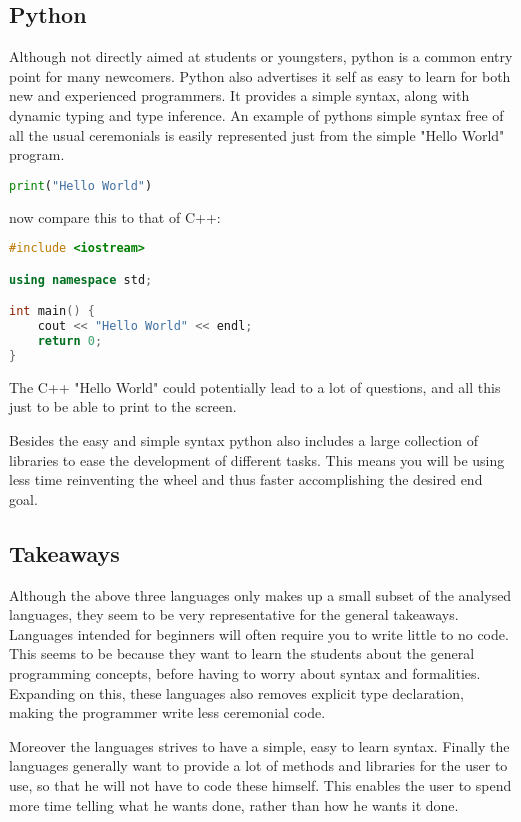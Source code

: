 \subsection{Python}
Although not directly aimed at students or youngsters, python is a common entry point for many newcomers. 
Python also advertises it self as easy to learn for both new and experienced programmers. 
It provides a simple syntax, along with dynamic typing and type inference.\cite{PythonWebsite}
An example of pythons simple syntax free of all the usual ceremonials is easily represented just from the simple "Hello World" program.

\begin{lstlisting}[language=Python,label=lis:PythonHelloWorld,caption=Hello World in python]
print("Hello World")
\end{lstlisting}

now compare this to that of C++:

\begin{lstlisting}[language=C++,label=lis:C++HelloWorld,caption=Hello World in C++]
#include <iostream>

using namespace std;

int main() {
	cout << "Hello World" << endl;
	return 0;
}
\end{lstlisting}

The C++ "Hello World" could potentially lead to a lot of questions, and all this just to be able to print to the screen.

Besides the easy and simple syntax python also includes a large collection of libraries to ease the development of different tasks.\cite{PythonLibraries}
This means you will be using less time reinventing the wheel and thus faster accomplishing the desired end goal.\cite{PythonXKCD}

\subsection{Takeaways}
Although the above three languages only makes up a small subset of the analysed languages, they seem to be very representative for the general takeaways. 
Languages intended for beginners will often require you to write little to no code. 
This seems to be because they want to learn the students about the general programming concepts, before having to worry about syntax and formalities. 
Expanding on this, these languages also removes explicit type declaration, making the programmer write less ceremonial code.

Moreover the languages strives to have a simple, easy to learn syntax. 
Finally the languages generally want to provide a lot of methods and libraries for the user to use, so that he will not have to code these himself. 
This enables the user to spend more time telling what he wants done, rather than how he wants it done.